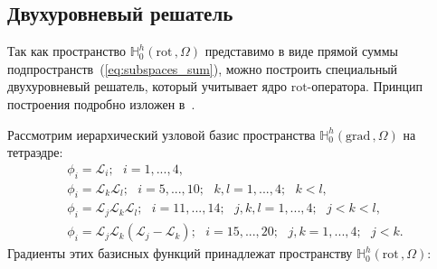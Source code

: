 \documentclass[a4paper,14pt]{article}
\begin{document}

\subsection{Двухуровневый решатель}
Так как пространство $\mathbb{H}_{0}^h( \mathrm{rot}\,, \Omega )$ представимо в виде прямой суммы подпространств~(\ref{eq:subspaces_sum}), можно построить специальный двухуровневый решатель, который учитывает ядро $\mathrm{rot}$-оператора. Принцип построения подробно изложен в~\citep{nechaev, shokin_multigrid}.

Рассмотрим иерархический узловой базис пространства $\mathbb{H}_{0}^h( \mathrm{grad}\,, \Omega )$ на тетраэдре:
\begin{equation*}
	\begin{matrix}
		\displaystyle
		\phi_{i} = \mathcal{L}_i ;
		\scriptstyle
		\text{~~} i = 1, ..., 4 ,\\
		\displaystyle
		\phi_{i} = \mathcal{L}_k \mathcal{L}_l ;
		\scriptstyle
		\text{~~} i = 5, ..., 10 ; \text{~~} k, l = 1, ..., 4 ; \text{~~} k < l ,\\
		\displaystyle
		\phi_{i} = \mathcal{L}_j \mathcal{L}_k \mathcal{L}_l ;
		\scriptstyle
		\text{~~} i = 11, ..., 14 ; \text{~~} j, k, l = 1, ..., 4 ; \text{~~} j < k < l ,\\
		\displaystyle
		\phi_{i} = \mathcal{L}_j \mathcal{L}_k ( \mathcal{L}_j - \mathcal{L}_k ) ;
		\scriptstyle
		\text{~~} i = 15, ..., 20 ; \text{~~} j, k = 1, ..., 4 ; \text{~~} j < k .
	\end{matrix}
	\label{eq:basis_nodal}
\end{equation*}
Градиенты этих базисных функций принадлежат пространству $\mathbb{H}_{0}^h( \mathrm{rot}\,, \Omega )$:
\end{document}
